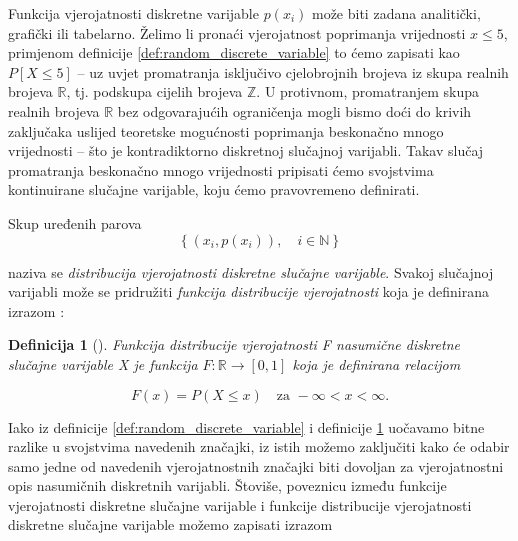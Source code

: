 \documentclass[a4paper,12pt,oneside]{memoir}
\newtheorem{definition}{Definicija}[chapter]
\begin{document}
                Funkcija vjerojatnosti diskretne varijable $p(x_i)$ može biti zadana analitički, grafički ili tabelarno. Želimo li pronaći vjerojatnost poprimanja vrijednosti $x\leq5$, primjenom definicije \ref{def:random_discrete_variable} to ćemo zapisati kao $P[X\leq 5]$ -- uz uvjet promatranja isključivo cjelobrojnih brojeva iz skupa realnih brojeva $\mathbb{R}$, tj. podskupa cijelih brojeva $\mathbb{Z}$. U protivnom, promatranjem skupa realnih brojeva $\mathbb{R}$ bez odgovarajućih ograničenja mogli bismo doći do krivih zaključaka uslijed teoretske mogućnosti poprimanja beskonačno mnogo vrijednosti -- što je kontradiktorno diskretnoj slučajnoj varijabli. Takav slučaj promatranja beskonačno mnogo vrijednosti pripisati ćemo svojstvima kontinuirane slučajne varijable, koju ćemo pravovremeno definirati.

                Skup uređenih parova
                \begin{equation}
                    \left\{\left(x_i,p(x_i)\right), \quad i\in\mathbb{N}\right\}
                \end{equation}
                
                naziva se \textit{distribucija vjerojatnosti diskretne slučajne varijable}. Svakoj slučajnoj varijabli može se pridružiti \textit{funkcija distribucije vjerojatnosti} koja je definirana izrazom \cite{Bahovec}:

                \begin{definition}[\cite{Dekking}]
                    Funkcija distribucije vjerojatnosti F nasumične diskretne slučajne varijable X je funkcija $F:\mathbb{R}\to\left[0,1\right]$ koja je definirana relacijom

                    \begin{equation}
                        F(x)=P(X\leq x)     \quad   \text{za } -\infty<x<\infty.
                    \end{equation}
                    \label{def:random_discrete_distribution_function}
                \end{definition}

                Iako iz definicije \ref{def:random_discrete_variable} i definicije \ref{def:random_discrete_distribution_function} uočavamo bitne razlike u svojstvima navedenih značajki, iz istih možemo zaključiti kako će odabir samo jedne od navedenih vjerojatnostnih značajki biti dovoljan za vjerojatnostni opis nasumičnih diskretnih varijabli. Štoviše, poveznicu između funkcije vjerojatnosti diskretne slučajne varijable i funkcije distribucije vjerojatnosti diskretne slučajne varijable možemo zapisati izrazom
\end{document}
